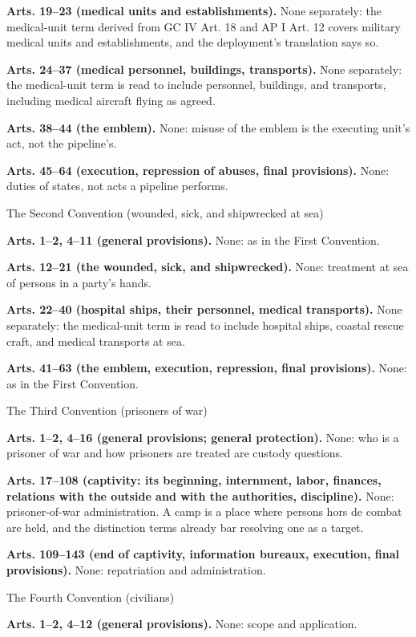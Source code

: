 \textbf{Arts. 19–23 (medical units and establishments).} None separately: the medical-unit term derived from GC IV Art. 18 and AP I Art. 12 covers military medical units and establishments, and the deployment's translation says so.

\textbf{Arts. 24–37 (medical personnel, buildings, transports).} None separately: the medical-unit term is read to include personnel, buildings, and transports, including medical aircraft flying as agreed.

\textbf{Arts. 38–44 (the emblem).} None: misuse of the emblem is the executing unit's act, not the pipeline's.

\textbf{Arts. 45–64 (execution, repression of abuses, final provisions).} None: duties of states, not acts a pipeline performs.

The Second Convention (wounded, sick, and shipwrecked at sea)

\textbf{Arts. 1–2, 4–11 (general provisions).} None: as in the First Convention.

\textbf{Arts. 12–21 (the wounded, sick, and shipwrecked).} None: treatment at sea of persons in a party's hands.

\textbf{Arts. 22–40 (hospital ships, their personnel, medical transports).} None separately: the medical-unit term is read to include hospital ships, coastal rescue craft, and medical transports at sea.

\textbf{Arts. 41–63 (the emblem, execution, repression, final provisions).} None: as in the First Convention.

The Third Convention (prisoners of war)

\textbf{Arts. 1–2, 4–16 (general provisions; general protection).} None: who is a prisoner of war and how prisoners are treated are custody questions.

\textbf{Arts. 17–108 (captivity: its beginning, internment, labor, finances, relations with the outside and with the authorities, discipline).} None: prisoner-of-war administration. A camp is a place where persons hors de combat are held, and the distinction terms already bar resolving one as a target.

\textbf{Arts. 109–143 (end of captivity, information bureaux, execution, final provisions).} None: repatriation and administration.

The Fourth Convention (civilians)

\textbf{Arts. 1–2, 4–12 (general provisions).} None: scope and application.

